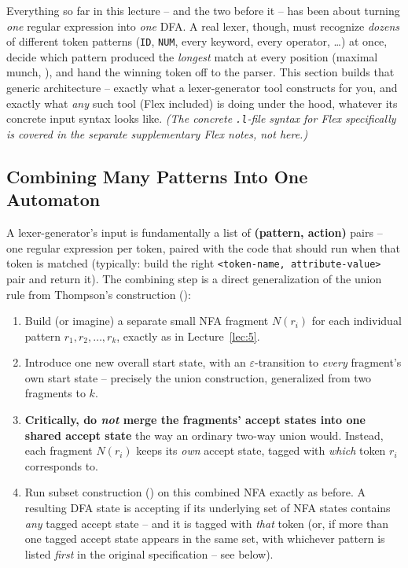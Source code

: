 \documentclass[full-course-notes.tex]{subfiles}
\begin{document}
\dbtag Everything so far in this lecture -- and the two before it -- has been about turning
\emph{one} regular expression into \emph{one} DFA. A real lexer, though, must recognize
\emph{dozens} of different token patterns (\texttt{ID}, \texttt{NUM}, every keyword, every
operator, \dots) at once, decide which pattern produced the \emph{longest} match at every
position (maximal munch, ), and hand the winning token off to the parser.
This section builds that generic architecture -- exactly what a lexer-generator tool constructs
for you, and exactly what \emph{any} such tool (Flex included) is doing under the hood, whatever
its concrete input syntax looks like. \emph{(The concrete \texttt{.l}-file syntax for Flex
specifically is covered in the separate supplementary Flex notes, not here.)}

\subsection{Combining Many Patterns Into One Automaton}
\label{sec:l6-lexgen-combining}

\dbtag A lexer-generator's input is fundamentally a list of \textbf{(pattern, action)} pairs --
one regular expression per token, paired with the code that should run when that token is
matched (typically: build the right \texttt{<token-name, attribute-value>} pair and return it).
The combining step is a direct generalization of the union rule from Thompson's construction
():

\begin{enumerate}
  \item Build (or imagine) a separate small NFA fragment $N(r_i)$ for each individual pattern
  $r_1, r_2, \dots, r_k$, exactly as in Lecture~\ref{lec:5}.
  \item Introduce one new overall start state, with an $\varepsilon$-transition to \emph{every}
  fragment's own start state -- precisely the union construction, generalized from two
  fragments to $k$.
  \item \textbf{Critically, do \emph{not} merge the fragments' accept states into one shared
  accept state} the way an ordinary two-way union would. Instead, each fragment $N(r_i)$ keeps
  its \emph{own} accept state, tagged with \emph{which} token $r_i$ corresponds to.
  \item Run subset construction () on this combined NFA exactly
  as before. A resulting DFA state is accepting if its underlying set of NFA states contains
  \emph{any} tagged accept state -- and it is tagged with \emph{that} token (or, if more than
  one tagged accept state appears in the same set, with whichever pattern is listed
  \emph{first} in the original specification -- see  below).
\end{enumerate}
\end{document}
